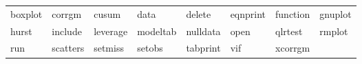 \begin{tabular}{llllllll}
boxplot & corrgm & cusum & data & delete & eqnprint & function & gnuplot \\
hurst & include & leverage & modeltab & nulldata & open & qlrtest & rmplot \\
run & scatters & setmiss & setobs & tabprint & vif & xcorrgm & \\
\end{tabular}


